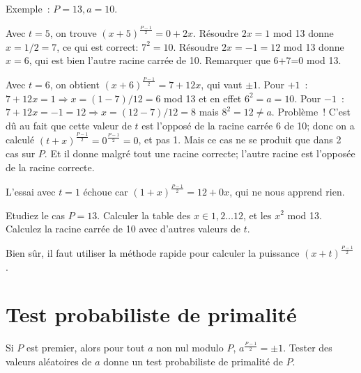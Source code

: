 \documentclass[a4paper]{article}
\begin{document}
Exemple~: $P=13, a=10$. 


Avec $t=5$, on trouve $(x+5)^{\frac{P-1}{2}}=0+2x$. 
R\'esoudre $2x=1$ mod 13 donne $x=1/2=7$, ce qui est correct: $7^2=10$. R\'esoudre 
$2x=-1=12$ mod 13 donne $x=6$, qui est bien l'autre racine carr\'ee de 10. 
Remarquer que 6+7=0  mod 13.

Avec $t=6$, on obtient $(x+6)^{\frac{P-1}{2}}=7+12 x$, qui vaut $\pm 1$.
Pour $+1$~: $7+12 x=1 \Rightarrow x=(1-7)/12=6$ mod 13 et en effet $6^2=a=10$.  
Pour $-1$~: $7+12 x= -1=12  \Rightarrow x=(12-7)/12=8$ mais  $8^2=12\neq a$. Probl\`eme~! C'est d\^u au fait que 
cette valeur de $t$ est l'oppos\'e de la racine carr\'ee 6 de 10; donc on a calcul\'e $(t+x)^{\frac{P-1}{2}}=0^{\frac{P-1}{2}}=0$, et pas 1. Mais ce cas ne se produit que dans 2 cas sur $P$.
Et il donne malgr\'e tout une racine correcte; l'autre racine est l'oppos\'ee de la racine correcte.

L'essai avec $t=1$ \'echoue car  $(1+x)^{\frac{P-1}{2}}=12+0x$, qui ne nous apprend rien.

Etudiez le cas $P=13$. Calculer la table des $x\in 1, 2\ldots 12$, et les $x^2$ mod 13.
Calculez la racine carr\'ee de 10 avec d'autres valeurs de $t$.

Bien s\^ur, il faut utiliser la m\'ethode rapide pour calculer la  puissance $(x+t)^{\frac{P-1}{2}}$.

\section{Test probabiliste de primalit\'e}
Si $P$ est premier, alors pour tout $a$ non nul modulo $P$, 
$a^{\frac{P-1}{2}}=\pm 1$.  Tester des valeurs al\'eatoires de $a$ donne un test probabiliste
de primalit\'e de $P$.
\end{document}
